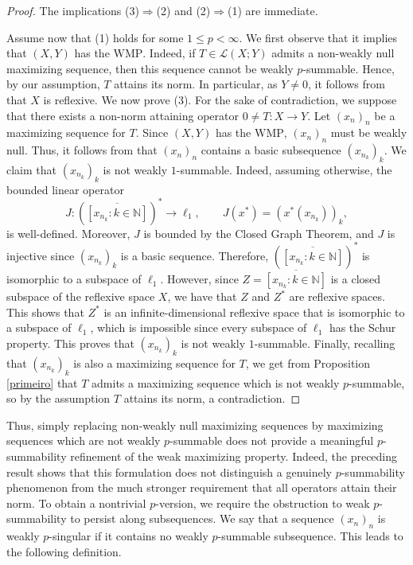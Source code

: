 \documentclass[12 pt]{article}%
\newtheorem{final remark}[theorem]{Final Remark}
\newcommand {\N} {\mathbb{N}}
\begin{document}
\begin{proof}
The implications (3)$\Rightarrow$(2) and (2)$\Rightarrow$(1) are immediate. 


Assume now that (1) holds for some $1 \leq p < \infty$. We first observe that it implies that $(X, Y)$ has the $\mathrm{WMP}$. Indeed, if $T \in \mathcal{L}(X; Y)$ admits a non-weakly null maximizing sequence, then this sequence cannot be weakly $p$-summable. Hence, by our assumption, $T$ attains its norm. In particular, as $Y \neq 0$, it follows from \cite[Corollary 2.5]{arongarciapelteix} that $X$ is reflexive. We now prove (3). For the sake of contradiction, we suppose that there exists a non-norm attaining operator $0 \neq T: X \to Y$. Let $(x_n)_n$ be a maximizing sequence for $T$. Since $(X, Y)$ has the $\mathrm{WMP}$, 
$(x_n)_n$ must be weakly null. Thus, it follows from \cite[Proposition 1.5.4]{albiac} that $(x_n)_n$ contains a basic subsequence $(x_{n_k})_k$. We claim that $(x_{n_k})_k$ is not weakly $1$-summable. Indeed, assuming otherwise, the bounded linear operator $$ J: (\overline{[x_{n_k} : k \in \N]})^* \to \ell_1, \qquad J(x^*) = (x^*(x_{n_k}))_k, $$
is well-defined. Moreover, $J$ is bounded by the Closed Graph Theorem, and $J$ is injective since $(x_{n_k})_k$ is a basic sequence. Therefore, $(\overline{[x_{n_k} : k \in \N]})^*$ is isomorphic to a subspace of $\ell_1$. 
However, since $Z = \overline{[x_{n_k} : k \in \N]}$ is a closed subspace of the reflexive space $X$, we have that $Z$ and $Z^*$ are reflexive spaces. This shows that $Z^*$ is an infinite-dimensional reflexive space that is isomorphic to a subspace of $\ell_1$, which is impossible since every subspace of $\ell_1$ has the Schur property. This proves that $(x_{n_k})_k$ is not weakly $1$-summable. 
Finally, recalling that $(x_{n_k})_k$ is also a maximizing sequence for $T$, we get from Proposition \ref{primeiro} that $T$ admits a maximizing sequence which is not weakly $p$-summable, so by the assumption $T$ attains its norm, a contradiction. 
\end{proof}


Thus, simply replacing non-weakly null maximizing sequences by maximizing sequences which are not weakly $p$-summable does not provide a meaningful $p$-summability refinement of the weak maximizing property. Indeed, the preceding result shows that this formulation does not distinguish a genuinely $p$-summability phenomenon from the much stronger requirement that all operators attain their norm. To obtain a nontrivial $p$-version, we require the obstruction to weak $p$-summability to persist along subsequences. We say that a sequence $(x_n)_n$ is weakly $p$-singular if it contains no weakly $p$-summable subsequence. This leads to the following definition.
\end{document}
